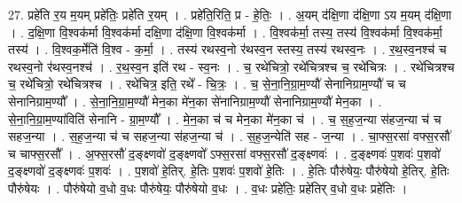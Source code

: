 \documentclass[17pt]{extarticle}
\begin{document}
27. प्रहे॑ति र॒य म॒यम् प्रहे॑तिः॒ प्रहे॑ति र॒यम् । . प्रहे॑ति॒रिति॒ प्र - हे॒तिः॒ । . अ॒यम् द॑क्षि॒णा द॑क्षि॒णा ऽय म॒यम् द॑क्षि॒णा । . द॒क्षि॒णा वि॒श्वक॑र्मा वि॒श्वक॑र्मा दक्षि॒णा द॑क्षि॒णा वि॒श्वक॑र्मा । . वि॒श्वक॑र्मा॒ तस्य॒ तस्य॑ वि॒श्वक॑र्मा वि॒श्वक॑र्मा॒ तस्य॑ । . वि॒श्वक॒र्मेति॑ वि॒श्व - क॒र्मा॒ । . तस्य॑ रथस्व॒नो र॑थस्व॒न स्तस्य॒ तस्य॑ रथस्व॒नः । . र॒थ॒स्व॒नश्च॑ च रथस्व॒नो र॑थस्व॒नश्च॑ । . र॒थ॒स्व॒न इति॑ रथ - स्व॒नः । . च॒ रथे॑चित्रो॒ रथे॑चित्रश्च च॒ रथे॑चित्रः । . रथे॑चित्रश्च च॒ रथे॑चित्रो॒ रथे॑चित्रश्च । . रथे॑चित्र॒ इति॒ रथे᳚ - चि॒त्रः॒ । . च॒ से॒ना॒नि॒ग्रा॒म॒ण्यौ॑ सेनानिग्राम॒ण्यौ॑ च च सेनानिग्राम॒ण्यौ᳚ । . से॒ना॒नि॒ग्रा॒म॒ण्यौ॑ मेन॒का मे॑न॒का से॑नानिग्राम॒ण्यौ॑ सेनानिग्राम॒ण्यौ॑ मेन॒का । . से॒ना॒नि॒ग्रा॒म॒ण्या॑विति॑ सेनानि - ग्रा॒म॒ण्यौ᳚ । . मे॒न॒का च॑ च मेन॒का मे॑न॒का च॑ । . च॒ स॒ह॒ज॒न्या स॑हज॒न्या च॑ च सहज॒न्या । . स॒ह॒ज॒न्या च॑ च सहज॒न्या स॑हज॒न्या च॑ । . स॒ह॒ज॒न्येति॑ सह - ज॒न्या । . चा॒फ्स॒रसा॑ वफ्स॒रसौ॑ च चाफ्स॒रसौ᳚ । . अ॒फ्स॒रसौ॑ द॒ङ्क्ष्णवो॑ द॒ङ्क्ष्णवो᳚ ऽफ्स॒रसा॑ वफ्स॒रसौ॑ द॒ङ्क्ष्णवः॑ । . द॒ङ्क्ष्णवः॑ प॒शवः॑ प॒शवो॑ द॒ङ्क्ष्णवो॑ द॒ङ्क्ष्णवः॑ प॒शवः॑ । . प॒शवो॑ हे॒तिर्. हे॒तिः प॒शवः॑ प॒शवो॑ हे॒तिः । . हे॒तिः पौरु॑षेयः॒ पौरु॑षेयो हे॒तिर्. हे॒तिः पौरु॑षेयः । . पौरु॑षेयो व॒धो व॒धः पौरु॑षेयः॒ पौरु॑षेयो व॒धः । . व॒धः प्रहे॑तिः॒ प्रहे॑तिर् व॒धो व॒धः प्रहे॑तिः । \newline
\end{document}
